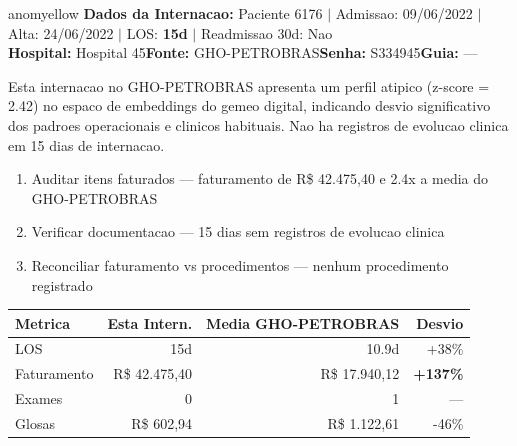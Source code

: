 \documentclass[a4paper,10pt]{article}
\begin{document}
\begin{anomalycard}[Internacao 5989 | GHO-PETROBRAS | MODERADO (z=2.42)]{anomyellow}
\textbf{Dados da Internacao:} Paciente 6176 $\mid$ Admissao: 09/06/2022 $\mid$ Alta: 24/06/2022 $\mid$ LOS: \textbf{15d} $\mid$ Readmissao 30d: Nao\\
\textbf{Hospital:} Hospital 45\quad\textbf{Fonte:} GHO-PETROBRAS\quad\textbf{Senha:} S334945\quad\textbf{Guia:} ---\\
\vspace{2pt}\begin{tcolorbox}[colback=severityred!20,colframe=anomyellow,title={\textbf{Interpretacao de Negocio}},fonttitle=\bfseries\small,left=4pt,right=4pt,top=3pt,bottom=3pt]
{\small Esta internacao no GHO-PETROBRAS apresenta um perfil atipico (z-score = 2.42) no espaco de embeddings do gemeo digital, indicando desvio significativo dos padroes operacionais e clinicos habituais. Nao ha registros de evolucao clinica em 15 dias de internacao.}
\end{tcolorbox}
\begin{tcolorbox}[colback=severityyellow!30,colframe=anomorange,title={\textbf{Recomendacoes Especificas}},fonttitle=\bfseries\small,left=4pt,right=4pt,top=3pt,bottom=3pt]
\begin{enumerate}[nosep,leftmargin=16pt]
\item {\small Auditar itens faturados --- faturamento de R\$ 42.475,40 e 2.4x a media do GHO-PETROBRAS}
\item {\small Verificar documentacao --- 15 dias sem registros de evolucao clinica}
\item {\small Reconciliar faturamento vs procedimentos --- nenhum procedimento registrado}
\end{enumerate}
\end{tcolorbox}
\begin{center}\begin{tabular}{l r r r}\toprule\textbf{Metrica} & \textbf{Esta Intern.} & \textbf{Media GHO-PETROBRAS} & \textbf{Desvio} \\\midrule
LOS & 15d & 10.9d & +38\% \\
Faturamento & R\$ 42.475,40 & R\$ 17.940,12 & \textcolor{anomred}{\textbf{+137\%}} \\
Exames & 0 & 1 & --- \\
Glosas & R\$ 602,94 & R\$ 1.122,61 & -46\% \\
\bottomrule\end{tabular}\end{center}


\end{anomalycard}
\end{document}
